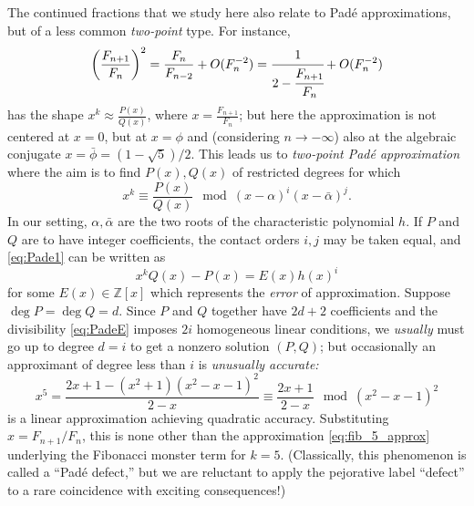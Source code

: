 \documentclass{article}
\numberwithin{equation}{section}
\theoremstyle{definition}
\theoremstyle{remark}
\newcommand{\ZZ}{\mathbb{Z}}
\renewcommand{\to}{\mathop{\rightarrow}\limits}
\newcommand{\<}{\left\langle}
\renewcommand{\>}{\right\rangle}
\begin{document}
The continued fractions that we study here also relate to Pad\'e approximations, but of a less common \emph{two-point} type. For instance,  \begin{equation} \label{eq:sol_sq}
  \left(\frac{F_{n+1}}{F_n}\right)^2 = \frac{F_{n}}{F_{n-2}} + O(F_n^{-2}) = \cfrac{1}{2 - \cfrac{F_{n+1}}{F_n}} + O(F_n^{-2})
\end{equation}
has the shape $x^k \approx \frac{P(x)}{Q(x)}$, where $x = \frac{F_{n+1}}{F_n}$; but here the approximation is not centered at $x = 0$, but at $x = \phi$ and (considering $n \to -\infty$) also at the algebraic conjugate $x = \bar\phi = (1 - \sqrt{5})/2$. This leads us to \emph{two-point Pad\'e approximation} \cite{Sidi1980}
where the aim is to find $P(x), Q(x)$ of restricted degrees for which
\begin{equation} \label{eq:Pade1}
  x^k \equiv \frac{P(x)}{Q(x)} \mod (x - \alpha)^i (x - \bar\alpha)^j.
\end{equation}
In our setting, $\alpha, \bar\alpha$ are the two roots of the characteristic polynomial $h$. If $P$ and $Q$ are to have integer coefficients, the contact orders $i, j$ may be taken equal, and \eqref{eq:Pade1} can be written as
\begin{equation} \label{eq:PadeE}
  x^k Q(x) - P(x) = E(x) h(x)^i
\end{equation}
for some $E(x) \in \ZZ[x]$ which represents the \emph{error} of approximation. Suppose $\deg P = \deg Q = d$. Since $P$ and $Q$ together have $2d + 2$ coefficients and the divisibility \eqref{eq:PadeE} imposes $2i$ homogeneous linear conditions, we \emph{usually} must go up to degree $d = i$ to get a nonzero solution $(P,Q)$; but occasionally an approximant of degree less than $i$ is \emph{unusually accurate:}
\begin{equation}\label{eq:fib_5_error}
  x^5 = \frac{2x+1 - (x^2+1)(x^2-x-1)^2}{2 - x} \equiv \frac{2x + 1}{2 - x} \mod (x^2 - x - 1)^2
\end{equation}
is a linear approximation achieving quadratic accuracy. Substituting $x = F_{n+1}/F_n$, this is none other than the approximation \eqref{eq:fib_5_approx} underlying the Fibonacci monster term for $k = 5$. (Classically, this phenomenon is called a ``Pad\'e defect,'' but we are reluctant to apply the pejorative label ``defect'' to a rare coincidence with exciting consequences!)
\end{document}
